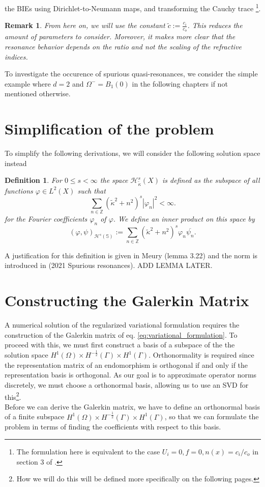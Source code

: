 \documentclass[10pt,journal,compsoc, onecolumn]{IEEEtran}
\newtheorem{definition}[theorem]{Definition}
\newtheorem{remark}[theorem]{Remark}
\begin{document}
the BIEs using Dirichlet-to-Neumann maps, and transforming the Cauchy trace \cite{meury2007stable} 
\footnote{The formulation here is equivalent to the case 
 $U_i = 0, f = 0, n(x) = c_i / c_o$ in section 3 of \cite{meury2007stable}.}.
\begin{remark}
    From here on, we will use the constant $\tilde c := \frac{c_i}{c_o}$. This reduces the amount of parameters 
    to consider. Moreover,
    it makes more clear that the resonance behavior 
    depends on the ratio and not the scaling
    of the refractive indices.
\end{remark}
To investigate the occurence of spurious quasi-resonances, 
we consider the simple example where $d = 2$ and $\Omega^- = B_1(0)$ in the following chapters if not mentioned otherwise. 

\section{Simplification of the problem}
To simplify the following derivations, we will consider the following solution space instead
\begin{definition} 
    For \(0 \leq s<\infty\) the space \(\mathcal{H}^{s}_{\tilde \kappa}(X)\) is defined as the subspace of all functions $\varphi \in L^{2}(X)$
    such that
    $$
    \sum_{n \in \mathbb{Z}}\left(\tilde \kappa^2+n^{2}\right)^{s}\left|\varphi_{n}\right|^{2}<\infty. 
    $$
    for the Fourier coefficients \(\varphi_{n}\) of \(\varphi\). We define an inner product on this space by
    $$
    (\varphi, \psi)_{\mathcal{H}^{s}(\mathbb{S})}:=\sum_{n \in \mathbb{Z}}\left(\tilde \kappa^2+n^{2}\right)^{s} \varphi_{n} \overline{\psi_{n}}.
    $$
\end{definition}
A justification for this definition is given in Meury (lemma 3.22) and the norm is introduced in (2021 Spurious resonances).
ADD LEMMA LATER.


\section{Constructing the Galerkin Matrix}
A numerical solution of the regularized variational formulation requires the 
construction of the Galerkin matrix of eq. \ref{eq:variational_formulation}. 
To proceed with this, we must first construct a
 basis of a subspace of the the solution space $H^{1}(\Omega)\times H^{-\frac{1}{2}}(\Gamma) \times H^1(\Gamma)$. 
Orthonormality is required since the representation matrix 
of an endomorphism is orthogonal if and only if the representation basis is orthogonal. 
As our goal is to approximate operator norms discretely, we must choose a orthonormal basis, 
allowing us to use an SVD for this\footnote{How we will do this will be defined more specifically on the following pages.}.\\
Before we can derive the Galerkin matrix, we have to define an orthonormal basis of a finite subspace $H^{1}(\Omega)\times H^{-\frac{1}{2}}(\Gamma) \times H^1(\Gamma)$, 
so that we can formulate the problem in terms of finding the coefficients with respect to this basis. \\ 
\end{document}
